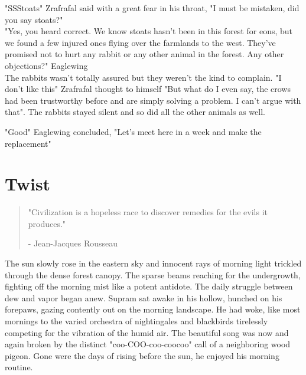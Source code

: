 \documentclass[smalldemyvopaper,11pt,twoside,onecolumn,openright,extrafontsizes]{memoir}
\begin{document}
"SSStoats" Zrafrafal said with a great fear in his throat, "I must be mistaken, did you say stoats?"\\

"Yes, you heard correct. We know stoats hasn't been in this forest for eons, but we found a few injured ones flying over the farmlands to the west. They've promised not to hurt any rabbit or any other animal in the forest. Any other objections?" Eaglewing  \\

The rabbits wasn't totally assured but they weren't the kind to complain. "I don't like this" Zrafrafal thought to himself "But what do I even say, the crows had been trustworthy before and are simply solving a problem. I can't argue with that". The rabbits stayed silent and so did all the other animals as well.

"Good" Eaglewing concluded, "Let's meet here in a week and make the replacement"


\chapter{Twist}

\vspace{-1.3cm}
\begin{localsize}{10}
	\begin{quote}
		"Civilization is a hopeless race to discover remedies for the evils it produces."
		\begin{flushright}- Jean-Jacques Rousseau\end{flushright}
	\end{quote} 
\end{localsize}
\vspace{1cm}

The sun slowly rose in the eastern sky and innocent rays of morning light trickled through the dense forest canopy. The sparse beams reaching for the undergrowth, fighting off the morning mist like a potent antidote. The daily struggle between dew and vapor began anew. Supram sat awake in his hollow, hunched on his forepaws, gazing contently out on the morning landscape. He had woke, like most mornings to the varied orchestra of nightingales and blackbirds tirelessly competing for the vibration of the humid air. The beautiful song was now and again broken by the distinct "coo-COO-coo-coocoo" call of a neighboring wood pigeon. Gone were the days of rising before the sun, he enjoyed his morning routine.\\
\end{document}
